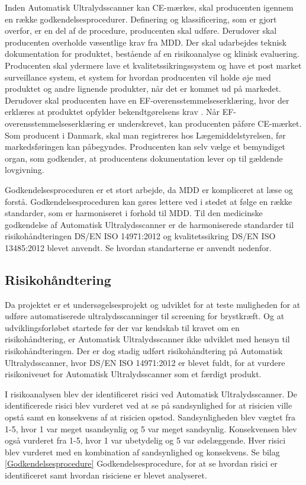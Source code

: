 Inden Automatisk Ultralydsscanner kan CE-mærkes, skal producenten igennem en række godkendelsesprocedurer. Definering og klassificering, som er gjort overfor, er en del af de procedure, producenten skal udføre. Derudover skal producenten overholde væsentlige krav fra MDD. Der skal udarbejdes teknisk dokumentation for produktet, bestående af en risikoanalyse og klinisk evaluering. Producenten skal ydermere lave et kvalitetssikringssystem og have et post market surveillance system, et system for hvordan producenten vil holde øje med produktet og andre lignende produkter, når det er kommet ud på markedet. Derudover skal producenten have en EF-overensstemmelseserklæring, hvor der  erklæres at produktet opfylder bekendtgørelsens krav \cite{Vej}. Når EF-overensstemmelseserklæring er underskrevet, kan producenten påføre CE-mærket. Som producent i Danmark, skal man registreres hos Lægemiddelstyrelsen, før markedsføringen kan påbegyndes. Producenten kan selv vælge et bemyndiget organ, som godkender, at producentens dokumentation lever op til gældende lovgivning. \cite{Klasse} 

Godkendelsesproceduren er et stort arbejde, da MDD er kompliceret at læse og forstå. Godkendelsesproceduren kan gøres lettere ved i stedet at følge en række standarder, som er harmoniseret i forhold til MDD. Til den medicinske godkendelse af Automatisk Ultralydsscanner er de harmoniserede standarder til risikohåndteringen DS/EN ISO 14971:2012 \cite{14971} og kvalitetssikring DS/EN ISO 13485:2012 \cite{13485} blevet anvendt. Se hvordan standarterne er anvendt nedenfor. 

\subsection{Risikohåndtering}
Da projektet er et undersøgelsesprojekt og udviklet for at teste muligheden for at udføre automatiserede ultralydsscanninger til screening for brystkræft. Og at udviklingsforløbet startede før der var kendskab til kravet om en risikohåndtering, er Automatisk Ultralydsscanner ikke udviklet med hensyn til risikohåndteringen. Der er dog stadig udført risikohåndtering på Automatisk Ultralydsscanner, hvor DS/EN ISO 14971:2012 \cite{14971} er blevet fuldt, for at vurdere risikoniveuet for Automatisk Ultralydsscanner som et færdigt produkt. 

I risikoanalysen blev der identificeret risici ved Automatisk Ultralydsscanner. De identificerede risici blev vurderet ved at se på sandsynlighed for at risicien ville opstå samt en konsekvens af at risicien opstod. Sandsynligheden blev vægtet fra 1-5, hvor 1 var meget usandsynlig og 5 var meget sandsynlig. Konsekvensen blev også vurderet fra 1-5, hvor 1 var ubetydelig og 5 var ødelæggende. Hver risici blev vurderet med en kombination af sandsynlighed og konsekvens. Se bilag \ref{Godkendelsesprocedure} Godkendelsesprocedure, for at se hvordan risici er identificeret samt hvordan risiciene er blevet analyseret. 

